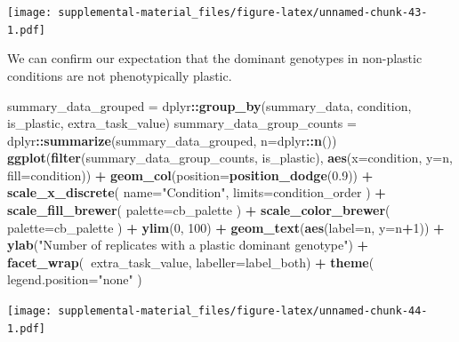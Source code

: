 \documentclass[]{book}
\newenvironment{Shaded}{\begin{snugshade}}{\end{snugshade}}
\newcommand{\DataTypeTok}[1]{\textcolor[rgb]{0.13,0.29,0.53}{#1}}
\newcommand{\DecValTok}[1]{\textcolor[rgb]{0.00,0.00,0.81}{#1}}
\newcommand{\FloatTok}[1]{\textcolor[rgb]{0.00,0.00,0.81}{#1}}
\newcommand{\KeywordTok}[1]{\textcolor[rgb]{0.13,0.29,0.53}{\textbf{#1}}}
\newcommand{\NormalTok}[1]{#1}
\newcommand{\OperatorTok}[1]{\textcolor[rgb]{0.81,0.36,0.00}{\textbf{#1}}}
\newcommand{\StringTok}[1]{\textcolor[rgb]{0.31,0.60,0.02}{#1}}
\begin{document}
\texttt{[image: supplemental-material\_files/figure-latex/unnamed-chunk-43-1.pdf]}

We can confirm our expectation that the dominant genotypes in non-plastic conditions are not phenotypically plastic.

\begin{Shaded}
\begin{Highlighting}[]
\NormalTok{summary_data_grouped =}\StringTok{ }\NormalTok{dplyr}\OperatorTok{::}\KeywordTok{group_by}\NormalTok{(summary_data, condition, is_plastic, extra_task_value)}
\NormalTok{summary_data_group_counts =}\StringTok{ }\NormalTok{dplyr}\OperatorTok{::}\KeywordTok{summarize}\NormalTok{(summary_data_grouped, }\DataTypeTok{n=}\NormalTok{dplyr}\OperatorTok{::}\KeywordTok{n}\NormalTok{())}
\KeywordTok{ggplot}\NormalTok{(}\KeywordTok{filter}\NormalTok{(summary_data_group_counts, is_plastic), }\KeywordTok{aes}\NormalTok{(}\DataTypeTok{x=}\NormalTok{condition, }\DataTypeTok{y=}\NormalTok{n, }\DataTypeTok{fill=}\NormalTok{condition)) }\OperatorTok{+}
\StringTok{  }\KeywordTok{geom_col}\NormalTok{(}\DataTypeTok{position=}\KeywordTok{position_dodge}\NormalTok{(}\FloatTok{0.9}\NormalTok{)) }\OperatorTok{+}
\StringTok{  }\KeywordTok{scale_x_discrete}\NormalTok{(}
    \DataTypeTok{name=}\StringTok{"Condition"}\NormalTok{,}
    \DataTypeTok{limits=}\NormalTok{condition_order}
\NormalTok{  ) }\OperatorTok{+}
\StringTok{  }\KeywordTok{scale_fill_brewer}\NormalTok{(}
    \DataTypeTok{palette=}\NormalTok{cb_palette}
\NormalTok{  ) }\OperatorTok{+}
\StringTok{  }\KeywordTok{scale_color_brewer}\NormalTok{(}
    \DataTypeTok{palette=}\NormalTok{cb_palette}
\NormalTok{  ) }\OperatorTok{+}
\StringTok{  }\KeywordTok{ylim}\NormalTok{(}\DecValTok{0}\NormalTok{, }\DecValTok{100}\NormalTok{) }\OperatorTok{+}
\StringTok{  }\KeywordTok{geom_text}\NormalTok{(}\KeywordTok{aes}\NormalTok{(}\DataTypeTok{label=}\NormalTok{n, }\DataTypeTok{y=}\NormalTok{n}\OperatorTok{+}\DecValTok{1}\NormalTok{)) }\OperatorTok{+}
\StringTok{  }\KeywordTok{ylab}\NormalTok{(}\StringTok{"Number of replicates with a plastic dominant genotype"}\NormalTok{) }\OperatorTok{+}
\StringTok{  }\KeywordTok{facet_wrap}\NormalTok{(}\OperatorTok{~}\NormalTok{extra_task_value, }\DataTypeTok{labeller=}\NormalTok{label_both) }\OperatorTok{+}
\StringTok{  }\KeywordTok{theme}\NormalTok{(}
    \DataTypeTok{legend.position=}\StringTok{"none"}
\NormalTok{  )}
\end{Highlighting}
\end{Shaded}

\texttt{[image: supplemental-material\_files/figure-latex/unnamed-chunk-44-1.pdf]}
\end{document}
